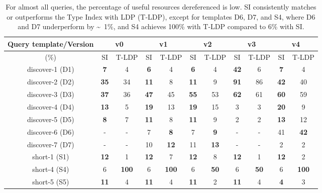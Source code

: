 \begin{table}[htbp]
	\begin{center}
		\begin{tabular}{|c|c|c|c|c|c|c|c|c|c|c|}
			\hline
            \multicolumn{1}{|c}{Query template/Version} & \multicolumn{2}{|c|}{v0} & \multicolumn{2}{|c|}{v1} & \multicolumn{2}{|c|}{v2} & \multicolumn{2}{|c|}{v3} & \multicolumn{2}{|c|}{v4} \\
			\hline
            (\%) & SI  & T-LDP & SI & T-LDP & SI & T-LDP& SI & T-LDP & SI & T-LDP \\
            \hline
			discover-1 (D1) & \textbf{7} & 4 & \textbf{6} & 4 & \textbf{6} & 4 & \textbf{42} & 6 & \textbf{7} & 4 \\
            \hline
            discover-2 (D2) & \textbf{35} & 34 & \textbf{11} & 8 & \textbf{11} & 9 & \textbf{91} & 86 & \textbf{42} & 40 \\
			\hline
            discover-3 (D3) & \textbf{37} & 36 & \textbf{47} & 45 & \textbf{55} & 53 & \textbf{62} & 61 & \textbf{60} & 59 \\
			\hline
            discover-4 (D4) & \textbf{13} & 5 & \textbf{19} & 13 & \textbf{19} & 15 & 3 & 3 & \textbf{20} & 9 \\
			\hline
            discover-5 (D5) & \textbf{8} & 7 & \textbf{11} & 8 & \textbf{11} & 9 & 2 & 2 & \textbf{13} & 12 \\
			\hline
            discover-6 (D6) & - & - & 7 & \textbf{8} & 7 & \textbf{9} & - & - & 41 & \textbf{42} \\
			\hline
            discover-7 (D7) & - & - & 10 & \textbf{12} & 11 & \textbf{13} & - & - & 2 & 2 \\
			\hline
            short-1 (S1) & \textbf{12} & 1 & \textbf{12} & 7 & \textbf{12} & 8 & \textbf{12} & 1 & \textbf{12} & 2 \\
			\hline
            short-4 (S4) & 6 & \textbf{100} & 6 & \textbf{100} & 6 & \textbf{50} & 6 & \textbf{50} & 6 & \textbf{100} \\
			\hline
            short-5 (S5) & \textbf{11} & 4 & \textbf{11} & 4 & \textbf{11} & 2 & \textbf{11} & 4 & \textbf{4} & 3 \\
			\hline
		\end{tabular}
	\end{center}
	\caption{
        For almost all queries, the percentage of useful resources dereferenced is low. 
		SI consistently matches or outperforms the Type Index with LDP (T-LDP), except for templates D6, D7, and S4, where D6 and D7 underperform by \textasciitilde~1\%, and S4 achieves 100\% with T-LDP compared to 6\% with SI.
		}
	\label{tab:ratioUsefulResources}
\end{table}